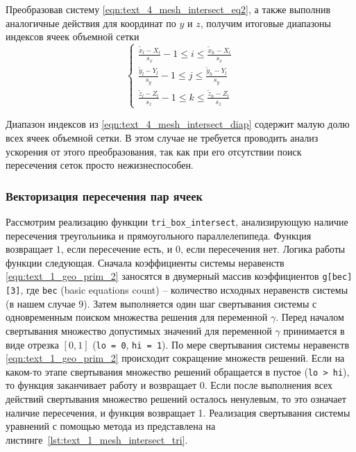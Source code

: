 Преобразовав систему \eqref{eqn:text_4_mesh_intersect_eq2}, а также выполнив аналогичные действия для координат по $y$ и $z$, получим итоговые диапазоны индексов ячеек объемной сетки
\begin{equation}\label{eqn:text_4_mesh_intersect_diap}
	\left\{
		\begin{aligned}
			\frac{\tilde{x}_l - X_l}{s_x} - 1 \le i \le \frac{\tilde{x}_h - X_l}{s_x} \\
			\frac{\tilde{y}_l - Y_l}{s_y} - 1 \le j \le \frac{\tilde{y}_h - Y_l}{s_y} \\
			\frac{\tilde{z}_l - Z_l}{s_z} - 1 \le k \le \frac{\tilde{z}_h - Z_l}{s_z}
		\end{aligned}
	\right.
\end{equation}

Диапазон индексов из \eqref{eqn:text_4_mesh_intersect_diap} содержит малую долю всех ячеек объемной сетки.
В этом случае не требуется проводить анализ ускорения от этого преобразования, так как при его отсутствии поиск пересечения сеток просто нежизнеспособен.

\subsubsection{Векторизация пересечения пар ячеек}

Рассмотрим реализацию функции \texttt{tri\_box\_intersect}, анализирующую наличие пересечения треугольника и прямоугольного параллелепипеда.
Функция возвращает $1$, если пересечение есть, и $0$, если пересечения нет.
Логика работы функции следующая.
Сначала коэффициенты системы неравенств \eqref{eqn:text_1_geo_prim_2} заносятся в двумерный массив коэффициентов \texttt{g[bec][3]}, где \texttt{bec} (basic equations count) -- количество исходных неравенств системы (в нашем случае 9).
Затем выполняется один шаг свертывания системы с одновременным поиском множества решения для переменной $\gamma$.
Перед началом свертывания множество допустимых значений для переменной $\gamma$ принимается в виде отрезка $[0, 1]$ (\texttt{lo = 0}, \texttt{hi = 1}).
По мере свертывания системы неравенств \eqref{eqn:text_1_geo_prim_2} происходит сокращение множеств решений.
Если на каком-то этапе свертывания множество решений обращается в пустое (\texttt{lo > hi}), то функция заканчивает работу и возвращает 0.
Если после выполнения всех действий свертывания множество решений осталось ненулевым, то это означает наличие пересечения, и функция возвращает 1.
Реализация свертывания системы уравнений с помощью метода из \cite{Chernikov1963} представлена на листинге~\ref{lst:text_1_mesh_intersect_tri}.

